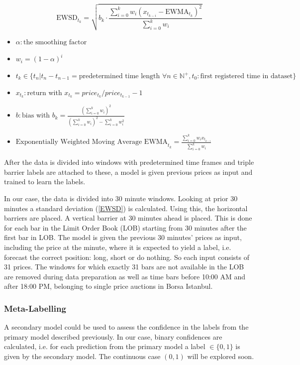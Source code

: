 \documentclass{article}
\begin{document}
\begin{equation} \label{EWSD}
    \text{EWSD}_{t_k} = \sqrt{ b_k \cdot \frac{\sum^k_{i=0} w_i (x_{t_{k-i}} - \text{EWMA}_{t_k})^2}{\sum^k_{i=0} w_i} }
\end{equation}

\begin{itemize}
    \item $\alpha: \text{the smoothing factor}$
    \item $w_i = (1 - \alpha)^i$
    \item ${t_k} \in \{ t_n |t_n - t_{n-1} = \text{predetermined time length } \forall n \in \mathbb{N}^{+},t_0: \text{first registered time in dataset} \}$
    \item $x_{t_k}: \text{return}$ with $x_{t_k} = price_{t_k}/price_{t_{k-1}} - 1$
    \item $b:\text{bias}$ with $b_k = \frac{(\sum^k_{i=0} w_i)^2}{(\sum^k_{i=0} w_i)^2 - \sum^k_{i=0} w_i^2}$
    \item $\text{Exponentially Weighted Moving Average EWMA}_{t_k} = \frac{\sum^k_{i=0} w_i x_{t_{k-i}}}{\sum^k_{i=0} w_i}$
\end{itemize}

After the data is divided into windows with predetermined time frames and triple barrier labels are attached to these, a model is given previous prices as input and trained to learn the labels. 

In our case, the data is divided into 30 minute windows. Looking at prior 30 minutes a standard deviation (\ref{EWSD}) is calculated. Using this, the horizontal barriers are placed. A vertical barrier at 30 minutes ahead is placed. This is done for each bar in the Limit Order Book (LOB) starting from 30 minutes after the first bar in LOB. The model is given the previous 30 minutes' prices as input, including the price at the minute, where it is expected to yield a label, i.e. forecast the correct position: long, short or do nothing. So each input consists of 31 prices. The windows for which exactly 31 bars are not available in the LOB are removed during data preparation as well as time bars before 10:00 AM and after 18:00 PM, belonging to single price auctions in Borsa Istanbul.

\subsubsection{Meta-Labelling}\label{sec::meta}
A secondary model could be used to assess the confidence in the labels from the primary model described previously. In our case, binary confidences are calculated, i.e. for each prediction from the primary model a label $\in \{0,1 \}$ is given by the secondary model. The continuous case $(0,1)$ will be explored soon. 
\end{document}
